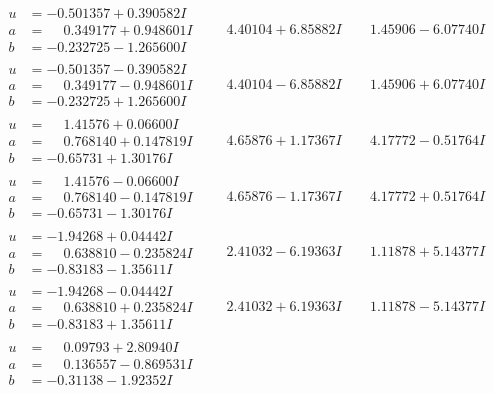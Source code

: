 \documentclass[1p]{elsarticle_modified}
\theoremstyle{definition}
\begin{document}
$$\begin{array}{c|c|c}
\begin{aligned}
u &= -0.501357 + 0.390582 I \\
a &= \phantom{-}0.349177 + 0.948601 I \\
b &= -0.232725 - 1.265600 I\end{aligned}
 & \phantom{-}4.40104 + 6.85882 I & \phantom{-}1.45906 - 6.07740 I \\ \hline\begin{aligned}
u &= -0.501357 - 0.390582 I \\
a &= \phantom{-}0.349177 - 0.948601 I \\
b &= -0.232725 + 1.265600 I\end{aligned}
 & \phantom{-}4.40104 - 6.85882 I & \phantom{-}1.45906 + 6.07740 I \\ \hline\begin{aligned}
u &= \phantom{-}1.41576 + 0.06600 I \\
a &= \phantom{-}0.768140 + 0.147819 I \\
b &= -0.65731 + 1.30176 I\end{aligned}
 & \phantom{-}4.65876 + 1.17367 I & \phantom{-}4.17772 - 0.51764 I \\ \hline\begin{aligned}
u &= \phantom{-}1.41576 - 0.06600 I \\
a &= \phantom{-}0.768140 - 0.147819 I \\
b &= -0.65731 - 1.30176 I\end{aligned}
 & \phantom{-}4.65876 - 1.17367 I & \phantom{-}4.17772 + 0.51764 I \\ \hline\begin{aligned}
u &= -1.94268 + 0.04442 I \\
a &= \phantom{-}0.638810 - 0.235824 I \\
b &= -0.83183 - 1.35611 I\end{aligned}
 & \phantom{-}2.41032 - 6.19363 I & \phantom{-}1.11878 + 5.14377 I \\ \hline\begin{aligned}
u &= -1.94268 - 0.04442 I \\
a &= \phantom{-}0.638810 + 0.235824 I \\
b &= -0.83183 + 1.35611 I\end{aligned}
 & \phantom{-}2.41032 + 6.19363 I & \phantom{-}1.11878 - 5.14377 I \\ \hline\begin{aligned}
u &= \phantom{-}0.09793 + 2.80940 I \\
a &= \phantom{-}0.136557 - 0.869531 I \\
b &= -0.31138 - 1.92352 I\end{aligned}

\end{array}$$
\end{document}
